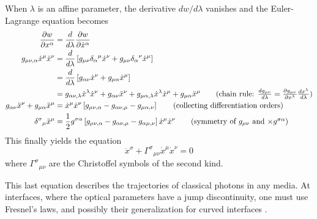 When $\lambda$ is an affine parameter, the derivative $dw/d\lambda$ vanishes \cite{TOP2005,SCH2009}
and the Euler-Lagrange equation becomes
  \begin{align*}
  \frac{\partial w}{\partial x^\alpha}			&= \frac{d}{d\lambda}\frac{\partial w}{\partial\dot{x}^\alpha}	\\
  g_{\mu\nu,\alpha}\dot{x}^\mu\dot{x}^\nu		&= \frac{d}{d\lambda}\left[g_{\mu\nu}{\delta_\alpha}^\mu\dot{x}^\nu+g_{\mu\nu}{\delta_\alpha}^\nu\dot{x}^\mu\right]	\\
							&= \frac{d}{d\lambda}\left[g_{\alpha\nu}\dot{x}^\nu+g_{\mu\alpha}\dot{x}^\mu\right]					\\
							&= g_{\alpha\nu,\lambda}\dot{x}^\lambda\dot{x}^\nu+g_{\alpha\nu}\ddot{x}^\nu+g_{\mu\alpha,\lambda}\dot{x}^\lambda\dot{x}^\mu+g_{\mu\alpha}\ddot{x}^\mu \tag{chain rule: $\frac{dg_{\mu\nu}}{d\lambda}=\frac{\partial g_{\mu\nu}}{\partial x^\lambda}\frac{dx^\lambda}{d\lambda}$}	\\
  g_{\alpha\nu}\ddot{x}^\nu+g_{\mu\alpha}\ddot{x}^\mu	&= \dot{x}^\mu\dot{x}^\nu\left[g_{\mu\nu,\alpha}-g_{\alpha\nu,\mu}-g_{\mu\alpha,\nu}\right]	\tag{collecting differentiation orders}	\\
  {\delta^\sigma}_\mu\ddot{x}^\mu			&= \frac{1}{2}g^{\sigma\alpha}\left[g_{\mu\nu,\alpha}-g_{\alpha\nu,\mu}-g_{\alpha\mu,\nu}\right]\dot{x}^\mu\dot{x}^\nu	\tag{symmetry of $g_{\mu\nu}$ and $\times g^{\sigma\alpha}$}
  \end{align*}
This finally yields the equation
  \begin{equation}
   \ddot{x}^\sigma + {\Gamma^\sigma}_{\mu\nu}\dot{x}^\mu\dot{x}^\nu=0
  \end{equation}
where ${\Gamma^\sigma}_{\mu\nu}$ are the Christoffel symbols of the second kind. 

This last equation describes the trajectories of classical photons in any media. 
At interfaces, where the optical parameters have a jump discontinuity, one must use
Fresnel's laws, and possibly their generalization for curved interfaces \cite{HEN2002a}.

